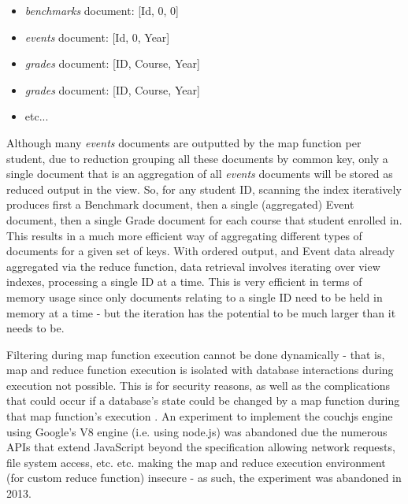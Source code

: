 \begin{itemize}
    \item \textit{benchmarks} document: [Id, 0, 0]
    \item \textit{events} document: [Id, 0, Year]
    \item \textit{grades} document: [ID, Course, Year]
    \item \textit{grades} document: [ID, Course, Year]
    \item etc...
\end{itemize}

Although many \textit{events} documents are outputted by the map function per student, due to reduction grouping all these documents by common key, only a single document that is an aggregation of all \textit{events} documents will be stored as reduced output in the view. So, for any student ID, scanning the index iteratively produces first a Benchmark document, then a single (aggregated) Event document, then a single Grade document for each course that student enrolled in. This results in a much more efficient way of aggregating different types of documents for a given set of keys. With ordered output, and Event data already aggregated via the reduce function, data retrieval involves iterating over view indexes, processing a single ID at a time. This is very efficient in terms of memory usage since only documents relating to a single ID need to be held in memory at a time - but the iteration has the potential to be much larger than it needs to be.

Filtering during map function execution cannot be done dynamically - that is, map and reduce function execution is isolated with database interactions during execution not possible. This is for security reasons, as well as the complications that could occur if a database's state could be changed by a map function during that map function's execution \cite{slack28Feb}. An experiment to implement the couchjs engine using Google's V8 engine (i.e. using node.js) was abandoned due the numerous APIs that extend JavaScript beyond the specification allowing network requests, file system access, etc. etc. \cite{v8couchjs, slack28Feb} making the map and reduce execution environment (for custom reduce function) insecure - as such, the experiment was abandoned in 2013.

